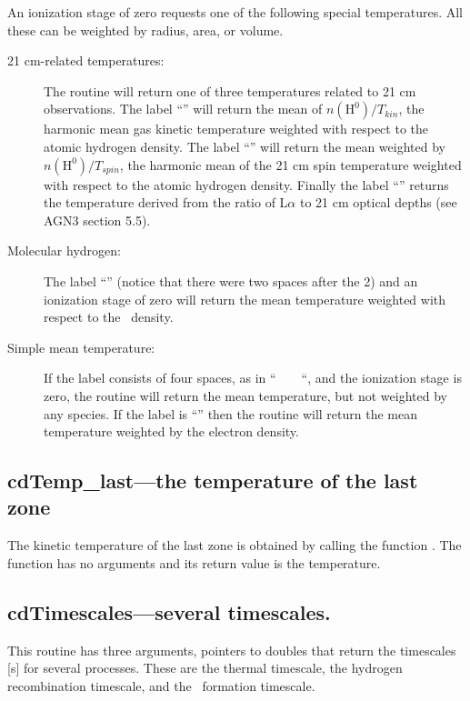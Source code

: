An ionization stage of zero requests one of the following special
temperatures. All these can be weighted by radius, area, or volume.
\begin{description}
\item[21 cm-related temperatures:]  The routine will return one of three
temperatures related to 21 cm observations.
The label ``\cdTerm{21cm}'' will return
the mean of $n(\mathrm{H}^0)/T_{kin}$, the harmonic mean gas kinetic temperature weighted
with respect to the atomic hydrogen density.
The label ``'' will return the mean weighted by
$n(\mathrm{H}^0)/T_{spin}$, the harmonic mean of the 21 cm spin temperature weighted with
respect to the atomic hydrogen density.
Finally the label ``'' returns the
temperature derived from the ratio of L$\alpha $ to 21
cm optical depths (see AGN3 section 5.5).

\item[Molecular hydrogen:]  The label ``'' (notice that there were two spaces
after the 2) and an ionization stage of zero will return the mean temperature
weighted with respect to the \htwo\ density.

\item[Simple mean temperature:]  If the label consists of four spaces, as in
``~~~~``, and the ionization stage is zero, the routine will return the
mean temperature, but not weighted by any
species. If the label is ``'' then the routine will return
the mean temperature weighted by the electron density.
\end{description}

\subsection{cdTemp\_last---the temperature of the last zone}

The kinetic temperature of the last zone is obtained by calling the
function .
The function has no arguments and its return value
is the temperature.

\subsection{cdTimescales---several timescales.}

This routine has three arguments, pointers to doubles that return the
timescales [s] for several processes.
These are the thermal timescale,
the hydrogen recombination timescale, and the \htwo\ formation timescale.

